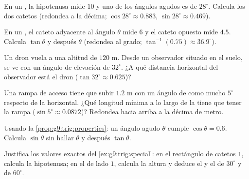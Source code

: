 \begin{exercise}[$\star$]\label{exo:g9:trig:4}
En un , la hipotenusa mide $10$ y uno de los ángulos agudos es de
$28^\circ$. Calcula los dos catetos (redondea a la décima;
$\cos 28^\circ \approx 0.883$, $\sin 28^\circ \approx 0.469$).
\end{exercise}

\begin{exercise}[$\star$]\label{exo:g9:trig:5}
En un , el cateto adyacente al ángulo $\theta$ mide $6$
y el cateto opuesto mide $4.5$. Calcula $\tan\theta$ y después $\theta$
(redondea al grado; $\tan^{-1}(0.75) \approx 36.9^\circ$).
\end{exercise}

\begin{exercise}[$\star\star$]\label{exo:g9:trig:6}
Un dron vuela a una altitud de $120$ m. Desde un observador situado en el suelo,
se ve con un ángulo de elevación de $32^\circ$. ¿A qué distancia horizontal
del observador está el dron
($\tan 32^\circ \approx 0.625$)?
\end{exercise}

\begin{exercise}[$\star\star$]\label{exo:g9:trig:7}
Una rampa de acceso tiene que subir $1.2$ m con un ángulo de como mucho $5^\circ$ respecto
de la horizontal. ¿Qué longitud mínima a lo largo de la  tiene que tener la rampa
($\sin 5^\circ \approx 0.0872$)? Redondea hacia arriba a la décima de
metro.
\end{exercise}

\begin{exercise}[$\star\star$]\label{exo:g9:trig:8}
Usando la \cref{prop:g9:trig:properties}: un ángulo agudo $\theta$ cumple
$\cos\theta = 0.6$. Calcula $\sin\theta$ sin hallar $\theta$ y después
$\tan\theta$.
\end{exercise}

\begin{exercise}[$\star\star\star$]\label{exo:g9:trig:9}
Justifica los valores exactos del \cref{ex:g9:trig:special}: en el
 rectángulo de catetos $1$, calcula la hipotenusa; en el
 de lado $1$, calcula la altura y deduce el
 y el  de $30^\circ$ y de $60^\circ$.
\end{exercise}

